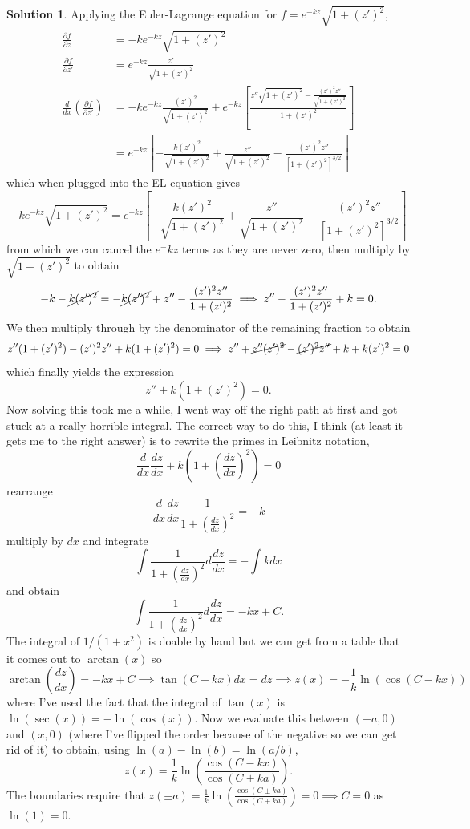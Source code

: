 \documentclass[10pt]{article}
\theoremstyle{definition}
\newtheorem{soln}{Solution}
\begin{document}
\begin{soln}
  Applying the Euler-Lagrange equation for $f=e^{-kz}\sqrt{1+(z')^2}$,
  \begin{align*}
    \frac{\partial f}{\partial z}                & =-ke^{-kz}\sqrt{1+(z')^2}                                                                                                         \\
    \frac{\partial f}{\partial z'}               & =e^{-kz}\frac{z'}{\sqrt{1+(z')^2}}                                                                                                \\
    \frac{d}{dx}(\frac{\partial f}{\partial z'}) & =-ke^{-kz}\frac{(z')^2}{\sqrt{1+(z')^2}}+e^{-kz}\left[\frac{z''\sqrt{1+(z')^2}-\frac{(z')^2z''}{\sqrt{1+(z')^2}}}{1+(z')^2}\right] \\
                                                 & =e^{-kz}\left[-\frac{k(z')^2}{\sqrt{1+(z')^2}}+\frac{z''}{\sqrt{1+(z')^2}}-\frac{(z')^2z''}{\left[1+(z')^2\right]^{3/2}}\right]
  \end{align*}
  which when plugged into the EL equation gives
  $$-ke^{-kz}\sqrt{1+(z')^2}=e^{-kz}\left[-\frac{k(z')^2}{\sqrt{1+(z')^2}}+\frac{z''}{\sqrt{1+(z')^2}}-\frac{(z')^2z''}{\left[1+(z')^2\right]^{3/2}}\right]$$
  from which we can cancel the $e^-kz$ terms as they are never zero, then multiply by $\sqrt{1+(z')^2}$ to obtain
  $$-k-\cancel{k(z')^2}=-\cancel{k(z')^2}+z''-\frac{(z')^2z''}{1+(z')^2}\implies z''-\frac{(z')^2z''}{1+(z')^2}+k=0.$$
  We then multiply through by the denominator of the remaining fraction to obtain
  $$z''(1+(z')^2)-(z')^2z''+k(1+(z')^2)=0 \implies z''+\cancel{z''(z')^2}-\cancel{(z')^2z''}+k+k(z')^2=0$$
  which finally yields the expression
  $$z''+k(1+(z')^2)=0.$$
  Now solving this took me a while, I went way off the right path at first and got stuck at a really horrible integral. The correct way to do this, I think (at least it gets me to the right answer)
  is to rewrite the primes in Leibnitz notation,
$$\frac{d}{dx}\frac{dz}{dx}+k\left(1+\left(\frac{dz}{dx}\right)^2\right)=0$$
rearrange
$$\frac{d}{dx}\frac{dz}{dx}\frac{1}{1+\left(\frac{dz}{dx}\right)^2}=-k$$
multiply by $dx$ and integrate
$$\int\frac{1}{1+\left(\frac{dz}{dx}\right)^2}d\frac{dz}{dx}=-\int kdx$$
and obtain
$$\int\frac{1}{1+\left(\frac{dz}{dx}\right)^2}d\frac{dz}{dx}=-kx+C.$$
The integral of $1/(1+x^2)$ is doable by hand but we can get from a table that it comes out to $\arctan(x)$ so 
$$\arctan(\frac{dz}{dx})=-kx+C\implies \tan(C-kx)dx=dz\implies z(x)=-\frac{1}{k}\ln(\cos(C-kx))$$
where I've used the fact that the integral of $\tan(x)$ is $\ln(\sec(x))=-\ln(\cos(x))$. Now we evaluate this between
$(-a,0)$ and $(x,0)$ (where I've flipped the order because of the negative so we can get rid of it) to obtain, using $\ln(a)-\ln(b)=\ln(a/b)$,
$$z(x)=\frac{1}{k}\ln(\frac{\cos(C-kx)}{\cos(C+ka)}).$$
The boundaries require that $z(\pm a)=\frac{1}{k}\ln(\frac{\cos(C\pm ka)}{\cos(C+ka)})=0\implies C=0$ as $\ln(1)=0$.
\end{soln}
\end{document}
